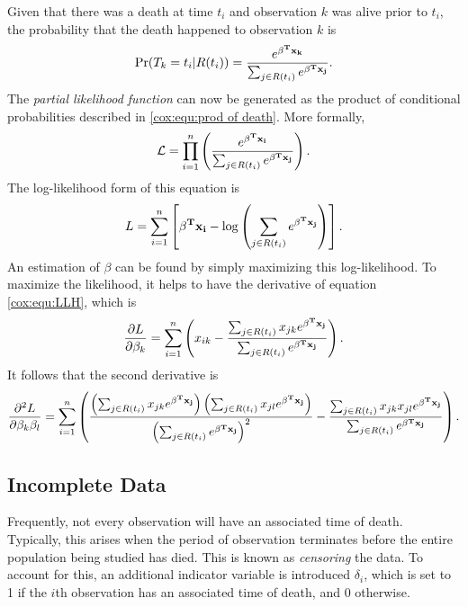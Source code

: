 \documentclass[12pt]{article}
\newcounter{count}
\begin{document}
Given that there was a death at time $t_i$ and observation $k$ was alive prior to $t_i$, the probability that the death happened to observation $k$  is
\begin{equation}\label{cox:equ:prod of death}
\Pr(T_k = t_i | R(t_i)) =  \frac{e^{\bold{\beta^T x_k} }}{ \sum_{j \in R(t_i)} e^{\bold{\beta^T x_j}}}.
\end{equation}
The \textit{partial likelihood function} can now be generated as the product of conditional probabilities described in \ref{cox:equ:prod of death}.  More formally,
\begin{equation}\label{cox:equ:likelihood}
\mathcal{L} = \prod_{i = 1}^n \left(  \frac{e^{\bold{\beta^T x_i} }}{ \sum_{j \in R(t_i)} e^{\bold{\beta^T x_j}}} \right).
\end{equation}
 The log-likelihood form of this equation is 
\begin{equation}\label{cox:equ:LLH}
L = \sum_{i = 1}^n \left[  \bold{\beta^T x_i} - \log\left(\sum_{j \in R(t_i)} e^{\bold{\beta^T x_j} } \right) \right].
\end{equation}
An estimation of $\beta$ can be found by simply maximizing this log-likelihood.  To maximize the likelihood, it helps to have the derivative of equation \ref{cox:equ:LLH}, which is 
\begin{equation}\label{cox:equ:LLH derivative}
\frac{\partial L}{\partial \beta_k} = \sum_{i = 1}^n \left( x_{ik} - \frac{\sum_{j \in R(t_i)} x_{jk} e^{\bold{\beta^T x_j} } }{\sum_{j \in R(t_i)} e^{\bold{\beta^T x_j} } } \right).
\end{equation}
It follows that the second derivative is
\begin{equation}\label{cox:equ:LLH second derivative}
\frac{\partial^2 L}{\partial \beta_k \beta_l} = \sum_{i = 1}^n \left(  \frac{\left(  \sum_{j \in R(t_i)} x_{jk} e^{\bold{\beta^T x_j} } \right) \left(  \sum_{j \in R(t_i)} x_{jl} e^{\bold{\beta^T x_j} } \right)}{\left( \sum_{j \in R(t_i)} e^{\bold{\beta^T x_j} } \right)^2 }   -  \frac{  \sum_{j \in R(t_i)} x_{jk}x_{jl} e^{\bold{\beta^T x_j} } }{\sum_{j \in R(t_i)} e^{\bold{\beta^T x_j} } } \right).
\end{equation}  

\subsection{Incomplete Data}
Frequently, not every observation will have an associated time of death.  Typically, this arises when the period of observation terminates before the entire population being studied has died.  This is known as \textit{censoring} the data.  To account for this, an additional indicator variable is introduced $\delta_i$, which is set to 1 if the $i$th observation has an associated time of death, and 0 otherwise.
\end{document}
